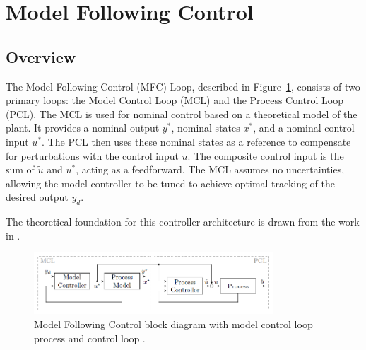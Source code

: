 \newpage

\section{Model Following Control}
\label{sec:model-following-control}


\subsection{Overview}

The Model Following Control (MFC) Loop, described in Figure~\ref{fig:MFC_Control_Loop}, 
consists of two primary loops: the Model Control Loop (MCL) and the Process Control Loop (PCL). 
The MCL is used for nominal control based on a theoretical model of the plant. It provides a nominal 
output \(y^*\), nominal states \(x^*\), and a nominal control input \(u^*\). The PCL then uses these nominal 
states as a reference to compensate for perturbations with the control input \(\tilde{u}\). The composite 
control input is the sum of \(\tilde{u}\) and \(u^*\), acting as a feedforward. The MCL assumes no 
uncertainties, allowing the model controller to be tuned to achieve optimal tracking of the desired 
output \(y_d\).

The theoretical foundation for this controller architecture is drawn from the work in \cite{Willkomm2023MFC}.

\begin{figure}[htbp]
    \centering
    \includegraphics[width=0.8\textwidth]{imgs/section1/MFC_scheme.PNG}
    \caption{Model Following Control block diagram with model control loop process and control loop \cite{Willkomm2023MFC}.}
    \label{fig:MFC_Control_Loop}
\end{figure}

